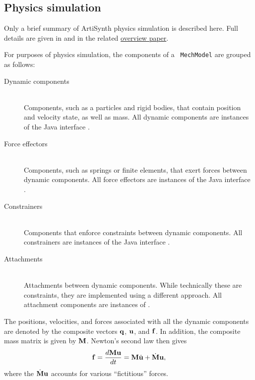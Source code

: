 \subsection{Physics simulation}
\label{PhysicsSimulation:sec}

Only a brief summary of ArtiSynth physics simulation is described
here.  Full details are given in \cite{lloyd2012artisynth} and in the
related
\href{http://www.artisynth.org/doc/artisynth.pdf}{overview
paper}.

For purposes of physics simulation, the components of a {\tt
MechModel} are grouped as follows:

\begin{description}
	
\item[Dynamic components] \mbox{}\hfill\\ Components, such as a
particles and rigid bodies, that contain position and velocity state,
as well as mass. All dynamic components are instances of
the Java interface
.

\item[Force effectors] \mbox{}\hfill\\
Components, such as springs or finite elements,
that exert forces between dynamic components.
All force effectors are instances of the Java interface
.

\item[Constrainers] \mbox{}\hfill\\
Components that enforce constraints between dynamic components. 
All constrainers are instances of the Java interface
.

\item[Attachments] \mbox{}\hfill\\
Attachments between dynamic components. While technically these
are constraints, they are implemented using a different approach.
All attachment components are instances of
.

\end{description}

The positions, velocities, and forces associated with all the
dynamic components are denoted by the composite vectors 
${\bf q}$, ${\bf u}$, and ${\bf f}$. 
In addition, the composite mass matrix is given by
${\bf M}$. 
Newton's second law then gives
\begin{equation}
{\bf f} = \frac{d {\bf M} {\bf u}}{d t} = {\bf M} \dot{{\bf u}} + \dot{{\bf M}} {\bf u},
\label{newton:eqn}
\end{equation}
%
where the $\dot{{\bf M}} {\bf u}$ accounts for various ``fictitious'' forces.


